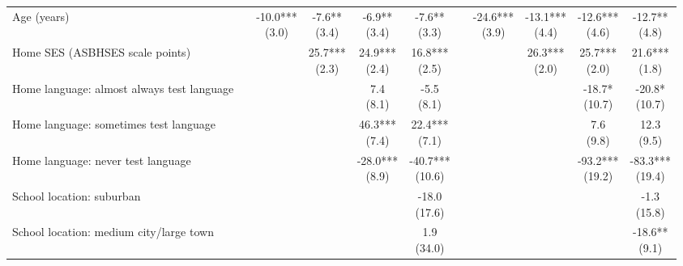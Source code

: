 \begin{table}[!htbp]
{\begin{tabular}{lcccccccccc}
Age (years) &  & \shortstack{-10.0***\\(3.0)} & \shortstack{-7.6**\\(3.4)} & \shortstack{-6.9**\\(3.4)} & \shortstack{-7.6**\\(3.3)} &  & \shortstack{-24.6***\\(3.9)} & \shortstack{-13.1***\\(4.4)} & \shortstack{-12.6***\\(4.6)} & \shortstack{-12.7**\\(4.8)} \\
Home SES (ASBHSES scale points) &  &  & \shortstack{25.7***\\(2.3)} & \shortstack{24.9***\\(2.4)} & \shortstack{16.8***\\(2.5)} &  &  & \shortstack{26.3***\\(2.0)} & \shortstack{25.7***\\(2.0)} & \shortstack{21.6***\\(1.8)} \\
Home language: almost always test language &  &  &  & \shortstack{7.4\\(8.1)} & \shortstack{-5.5\\(8.1)} &  &  &  & \shortstack{-18.7*\\(10.7)} & \shortstack{-20.8*\\(10.7)} \\
Home language: sometimes test language &  &  &  & \shortstack{46.3***\\(7.4)} & \shortstack{22.4***\\(7.1)} &  &  &  & \shortstack{7.6\\(9.8)} & \shortstack{12.3\\(9.5)} \\
Home language: never test language &  &  &  & \shortstack{-28.0***\\(8.9)} & \shortstack{-40.7***\\(10.6)} &  &  &  & \shortstack{-93.2***\\(19.2)} & \shortstack{-83.3***\\(19.4)} \\
School location: suburban &  &  &  &  & \shortstack{-18.0\\(17.6)} &  &  &  &  & \shortstack{-1.3\\(15.8)} \\
School location: medium city/large town &  &  &  &  & \shortstack{1.9\\(34.0)} &  &  &  &  & \shortstack{-18.6**\\(9.1)} \\

\end{tabular}}
\end{table}
